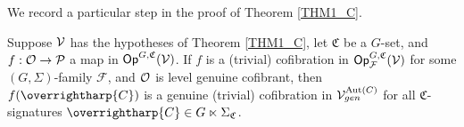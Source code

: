 \documentclass[a4paper,10pt
,draft
]{article}%
\renewcommand{\F}{\mathcal F}
\renewcommand{\1}{\eta}%
\newcommand{\vect}[1]{\text{\overrightharp{\ensuremath{#1}}}}
\begin{document}
We record a particular step in the proof of Theorem \ref{THM1_C}.
\begin{corollary}
      \label{LGC_COR}
      Suppose $\mathcal V$ has the hypotheses of Theorem \ref{THM1_C},
      let $\mathfrak C$ be a $G$-set, and $f: \mathcal{O} \to \mathcal{P}$ a map in $\mathsf{Op}^{G,\mathfrak C}(\mathcal V)$.
      If $f$ is a (trivial) cofibration in $\Op^{G, \mathfrak C}_\F(\V)$ for some $(G, \Sigma)$-family $\F$,
      and $\mathcal{O}$ is level genuine cofibrant, then
      $f(\vect C)$ is a genuine (trivial) cofibration in $\mathcal V^{\operatorname{Aut}(C)}_{gen}$ for all $\mathfrak C$-signatures $\vect C \in G \ltimes \Sigma_{\mathfrak C}$.
\end{corollary}
      
\end{document}
